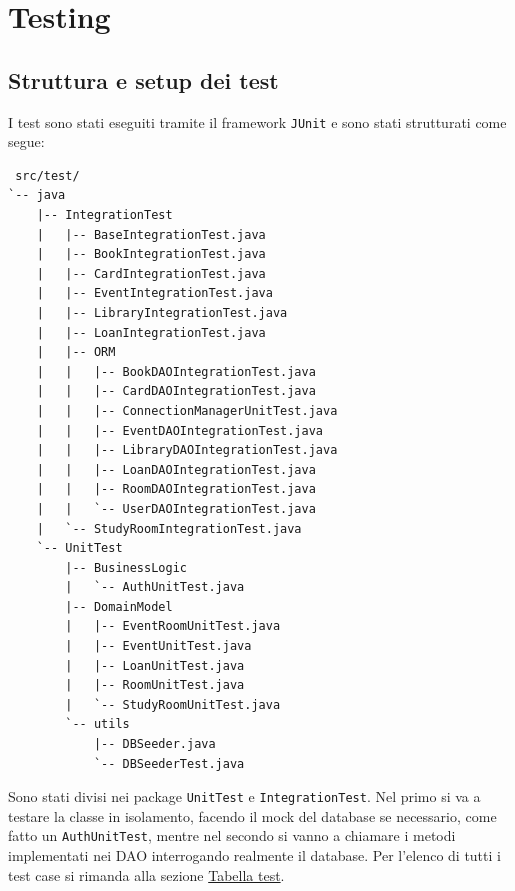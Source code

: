 \section{Testing}
\subsection{Struttura e setup dei test}\label{subsec:struttura}
I test sono stati eseguiti tramite il framework \texttt{JUnit} e sono stati strutturati come segue:
\begin{verbatim}
 src/test/
`-- java
    |-- IntegrationTest
    |   |-- BaseIntegrationTest.java
    |   |-- BookIntegrationTest.java
    |   |-- CardIntegrationTest.java
    |   |-- EventIntegrationTest.java
    |   |-- LibraryIntegrationTest.java
    |   |-- LoanIntegrationTest.java
    |   |-- ORM
    |   |   |-- BookDAOIntegrationTest.java
    |   |   |-- CardDAOIntegrationTest.java
    |   |   |-- ConnectionManagerUnitTest.java
    |   |   |-- EventDAOIntegrationTest.java
    |   |   |-- LibraryDAOIntegrationTest.java
    |   |   |-- LoanDAOIntegrationTest.java
    |   |   |-- RoomDAOIntegrationTest.java
    |   |   `-- UserDAOIntegrationTest.java
    |   `-- StudyRoomIntegrationTest.java
    `-- UnitTest
        |-- BusinessLogic
        |   `-- AuthUnitTest.java
        |-- DomainModel
        |   |-- EventRoomUnitTest.java
        |   |-- EventUnitTest.java
        |   |-- LoanUnitTest.java
        |   |-- RoomUnitTest.java
        |   `-- StudyRoomUnitTest.java
        `-- utils
            |-- DBSeeder.java
            `-- DBSeederTest.java
\end{verbatim}
Sono stati divisi nei package \texttt{UnitTest} e \texttt{IntegrationTest}. Nel primo si va a testare la classe in isolamento, facendo il mock del database se necessario, come fatto un \texttt{AuthUnitTest}, mentre nel secondo si vanno a chiamare i metodi implementati nei DAO interrogando realmente il database. Per l'elenco di tutti i test case si rimanda alla sezione \hyperref[tabella_test]{Tabella test}.

